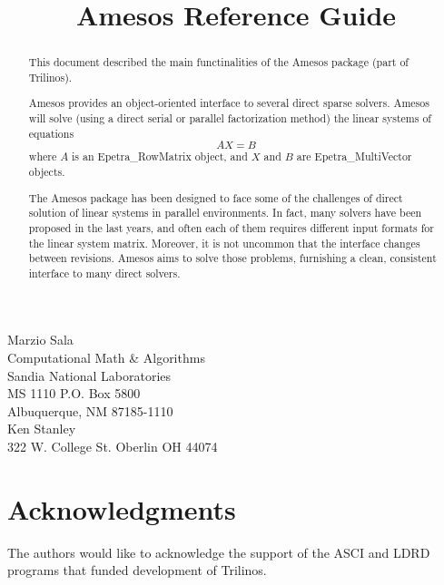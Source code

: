 \documentclass[11pt]{SANDreport}
\title{Amesos Reference Guide}
\begin{document}
\maketitle

\begin{center}
Marzio  Sala \\
Computational Math \& Algorithms \\
Sandia National Laboratories\\
MS 1110 P.O. Box 5800 \\
Albuquerque, NM 87185-1110\\[30pt]
Ken Stanley\\
322 W. College St.
Oberlin OH 44074
\end{center}

\vspace{20pt}

\begin{abstract}
  
  This document described the main functinalities of the Amesos package
  (part of Trilinos).
  
  Amesos provides an object-oriented interface to several direct sparse
  solvers. Amesos will solve (using a direct serial or parallel
  factorization method) the linear systems of equations
  \begin{equation}
    \label{eq:linear_system}
    A X = B
  \end{equation}
  where $A$ is an Epetra\_RowMatrix object, and $X$ and $B$ are
  Epetra\_MultiVector objects.
  
  The Amesos package has been designed to face some of the challenges of
  direct solution of linear systems in parallel environments. In fact,
  many solvers have been proposed in the last years, and often each of
  them requires different input formats for the linear system matrix.
  Moreover, it is not uncommon that the interface changes between
  revisions. Amesos aims to solve those problems, furnishing a clean,
  consistent interface to many direct solvers.
  
\end{abstract}

\clearpage

\SANDmain

\tableofcontents

\clearpage

\section*{Acknowledgments}
The authors would like to acknowledge the support of the ASCI and LDRD programs
that funded development of Trilinos.
\end{document}
